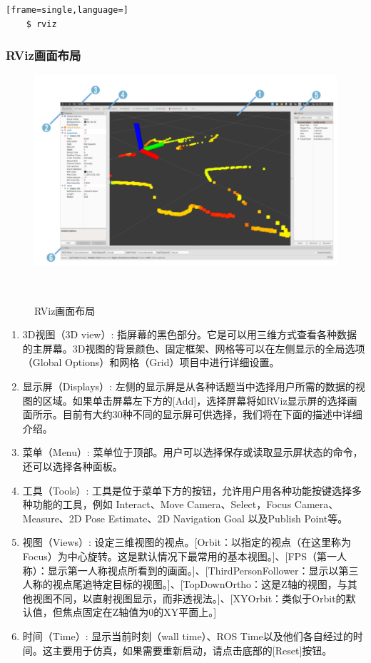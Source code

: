 \documentclass[geye,green,kindle,cn]{elegantnote}
\begin{document}
\begin{lstlisting}[frame=single,language=]
    $ rviz
\end{lstlisting}
\subsubsection{RViz画面布局}
\begin{figure}[htbp]
    \centering
    \includegraphics[width=1\linewidth]{src/C.png}
    \centering
    \caption{RViz画面布局} \label{picture:C}
\end{figure}

\begin{enumerate}
    \item 3D视图（3D view）: 指屏幕的黑色部分。它是可以用三维方式查看各种数据的主屏幕。3D视图的背景颜色、固定框架、网格等可以在左侧显示的全局选项（Global Options）和网格（Grid）项目中进行详细设置。
    \item 显示屏（Displays）: 左侧的显示屏是从各种话题当中选择用户所需的数据的视图的区域。如果单击屏幕左下方的[Add]，选择屏幕将如RViz显示屏的选择画面所示。目前有大约30种不同的显示屏可供选择，我们将在下面的描述中详细介绍。
    \item 菜单（Menu）: 菜单位于顶部。用户可以选择保存或读取显示屏状态的命令，还可以选择各种面板。
    \item 工具（Tools）: 工具是位于菜单下方的按钮，允许用户用各种功能按键选择多种功能的工具，例如 Interact、Move Camera、Select，Focus Camera、Measure、2D Pose Estimate、2D Navigation Goal 以及Publish Point等。
    \item 视图（Views）: 设定三维视图的视点。[Orbit：以指定的视点（在这里称为Focus）为中心旋转。这是默认情况下最常用的基本视图。]、[FPS（第一人称）：显示第一人称视点所看到的画面。]、[ThirdPersonFollower：显示以第三人称的视点尾追特定目标的视图。]、[TopDownOrtho：这是Z轴的视图，与其他视图不同，以直射视图显示，而非透视法。]、[XYOrbit：类似于Orbit的默认值，但焦点固定在Z轴值为0的XY平面上。] 
    \item  时间（Time）: 显示当前时刻（wall time）、ROS Time以及他们各自经过的时间。这主要用于仿真，如果需要重新启动，请点击底部的[Reset]按钮。
\end{enumerate}
\end{document}
